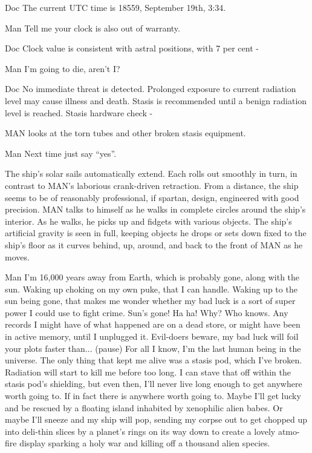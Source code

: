 \documentclass{screenplay}
\begin{document}
\begin{dialogue}{Doc}
The current UTC time is 18559, September 19th, 3:34.
\end{dialogue}
\begin{dialogue}{Man}
Tell me your clock is also out of warranty.
\end{dialogue}
\begin{dialogue}{Doc}
Clock value is consistent with astral positions, with 7 per cent -
\end{dialogue}
\begin{dialogue}[interrupting]{Man}
I'm going to die, aren't I?
\end{dialogue}
\begin{dialogue}{Doc}
No immediate threat is detected.  Prolonged exposure to current radiation level may cause illness and death.  Stasis is recommended until a benign radiation level is reached.  Stasis hardware check -
\end{dialogue}
MAN looks at the torn tubes and other broken stasis equipment.
\begin{dialogue}[interrupting]{Man}
Next time just say ``yes''.
\end{dialogue}
The ship's solar sails automatically extend.  Each rolls out smoothly in turn, in contrast to MAN's laborious crank-driven retraction.  From a distance, the ship seems to be of reasonably professional, if spartan, design, engineered with good precision.
MAN talks to himself as he walks in complete circles around the ship's interior.  As he walks, he picks up and fidgets with various objects.  The ship's artificial gravity is seen in full, keeping objects he drops or sets down fixed to the ship's floor as it curves behind, up, around, and back to the front of MAN as he moves.
\begin{dialogue}[to himself]{Man}
I'm 16,000 years away from Earth, which is probably gone, along with the sun.  Waking up choking on my own puke, that I can handle.  Waking up to the sun being gone, that makes me wonder whether my bad luck is a sort of super power I could use to fight crime.  Sun's gone!  Ha ha!  Why?  Who knows.  Any records I might have of what happened are on a dead store, or might have been in active memory, until I unplugged it.  Evil-doers beware, my bad luck will foil your plots faster than...  (pause) For all I know, I'm the last human being in the universe.  The only thing that kept me alive was a stasis pod, which I've broken.  Radiation will start to kill me before too long.  I can stave that off within the stasis pod's shielding, but even then, I'll never live long enough to get anywhere worth going to.  If in fact there is anywhere worth going to.  Maybe I'll get lucky and be rescued by a floating island inhabited by xenophilic alien babes.  Or maybe I'll sneeze and my ship will pop, sending my corpse out to get chopped up into deli-thin slices by a planet's rings on its way down to create a lovely atmo-fire display sparking a holy war and killing off a thousand alien species.
\end{dialogue}
\end{document}
